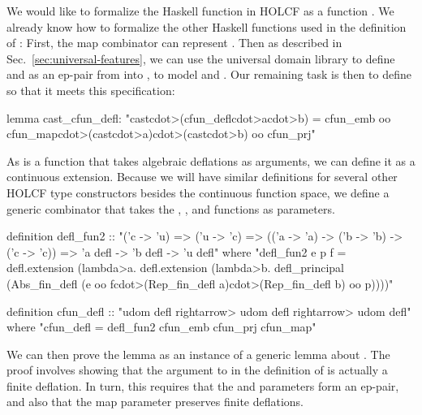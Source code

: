 We would like to formalize the Haskell function  in HOLCF as a function . We already know how to formalize the other Haskell functions used in the definition of : First, the map combinator  can represent . Then as described in Sec.~\ref{sec:universal-features}, we can use the universal domain library to define  and  as an ep-pair from  into , to model  and . Our remaining task is then to define  so that it meets this specification:

\begin{isacode}
lemma cast_cfun_defl:
  "cast\<cdot>(cfun_defl\<cdot>a\<cdot>b) = cfun_emb oo cfun_map\<cdot>(cast\<cdot>a)\<cdot>(cast\<cdot>b) oo cfun_prj"
\end{isacode}

As  is a function that takes algebraic deflations as arguments, we can define it as a continuous extension. Because we will have similar definitions for several other HOLCF type constructors besides the continuous function space, we define a generic combinator  that takes the , , and  functions as parameters.

\begin{isacode}
definition defl_fun2 ::
    "('c -> 'u) => ('u -> 'c) => (('a -> 'a) -> ('b -> 'b) -> ('c -> 'c))
        => 'a defl -> 'b defl -> 'u defl"
  where "defl_fun2 e p f =
    defl.extension (\<lambda>a. defl.extension (\<lambda>b. defl_principal
      (Abs_fin_defl (e oo f\<cdot>(Rep_fin_defl a)\<cdot>(Rep_fin_defl b) oo p))))"
\end{isacode}
\unmedskip
{}
\begin{isacode}
definition cfun_defl :: "udom defl \<rightarrow> udom defl \<rightarrow> udom defl"
  where "cfun_defl = defl_fun2 cfun_emb cfun_prj cfun_map"
\end{isacode}

We can then prove the lemma  as an instance of a generic lemma about . The proof involves showing that the argument to  in the definition of  is actually a finite deflation. In turn, this requires that the  and  parameters form an ep-pair, and also that the map parameter  preserves finite deflations.

